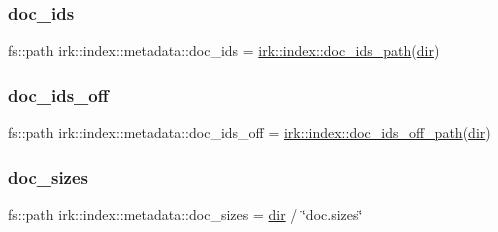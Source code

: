 \mbox{\label{structirk_1_1index_1_1metadata_a20168da918488d66694b1da2f0542b83}} 
\subsubsection{\texorpdfstring{doc\+\_\+ids}{doc\_ids}}
{\footnotesize\ttfamily fs\+::path irk\+::index\+::metadata\+::doc\+\_\+ids = \mbox{\hyperlink{namespaceirk_1_1index_ac1625c6287b43b8f77d552c3340a2034}{irk\+::index\+::doc\+\_\+ids\+\_\+path}}(\mbox{\hyperlink{structirk_1_1index_1_1metadata_a355b4325c022cd152e68fc18b1775fc6}{dir}})}

\mbox{\label{structirk_1_1index_1_1metadata_a249ece1de7a87e894345d7c987609e8e}} 
\subsubsection{\texorpdfstring{doc\+\_\+ids\+\_\+off}{doc\_ids\_off}}
{\footnotesize\ttfamily fs\+::path irk\+::index\+::metadata\+::doc\+\_\+ids\+\_\+off = \mbox{\hyperlink{namespaceirk_1_1index_ae4d01a34d5e8b61eaef5cc0d21e18f10}{irk\+::index\+::doc\+\_\+ids\+\_\+off\+\_\+path}}(\mbox{\hyperlink{structirk_1_1index_1_1metadata_a355b4325c022cd152e68fc18b1775fc6}{dir}})}

\mbox{\label{structirk_1_1index_1_1metadata_a7aa4d97e4e11c582380ad03e18eb62bb}} 
\subsubsection{\texorpdfstring{doc\+\_\+sizes}{doc\_sizes}}
{\footnotesize\ttfamily fs\+::path irk\+::index\+::metadata\+::doc\+\_\+sizes = \mbox{\hyperlink{structirk_1_1index_1_1metadata_a355b4325c022cd152e68fc18b1775fc6}{dir}} / \char`\"{}doc.\+sizes\char`\"{}}

